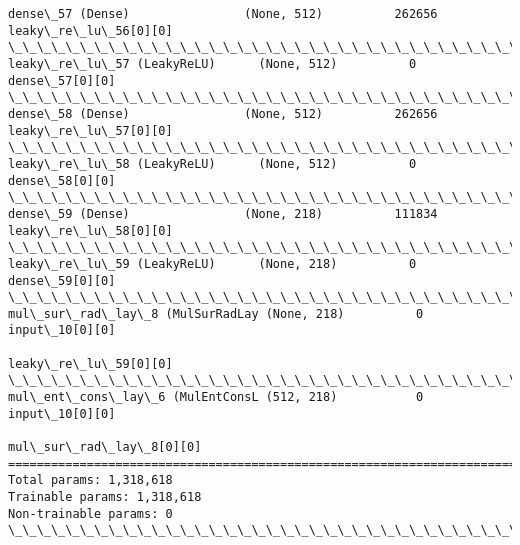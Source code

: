\documentclass[11pt]{article}
\begin{document}
\begin{Verbatim}[commandchars=\\\{\}]
dense\_57 (Dense)                (None, 512)          262656      leaky\_re\_lu\_56[0][0]             
\_\_\_\_\_\_\_\_\_\_\_\_\_\_\_\_\_\_\_\_\_\_\_\_\_\_\_\_\_\_\_\_\_\_\_\_\_\_\_\_\_\_\_\_\_\_\_\_\_\_\_\_\_\_\_\_\_\_\_\_\_\_\_\_\_\_\_\_\_\_\_\_\_\_\_\_\_\_\_\_\_\_\_\_\_\_\_\_\_\_\_\_\_\_\_\_\_\_
leaky\_re\_lu\_57 (LeakyReLU)      (None, 512)          0           dense\_57[0][0]                   
\_\_\_\_\_\_\_\_\_\_\_\_\_\_\_\_\_\_\_\_\_\_\_\_\_\_\_\_\_\_\_\_\_\_\_\_\_\_\_\_\_\_\_\_\_\_\_\_\_\_\_\_\_\_\_\_\_\_\_\_\_\_\_\_\_\_\_\_\_\_\_\_\_\_\_\_\_\_\_\_\_\_\_\_\_\_\_\_\_\_\_\_\_\_\_\_\_\_
dense\_58 (Dense)                (None, 512)          262656      leaky\_re\_lu\_57[0][0]             
\_\_\_\_\_\_\_\_\_\_\_\_\_\_\_\_\_\_\_\_\_\_\_\_\_\_\_\_\_\_\_\_\_\_\_\_\_\_\_\_\_\_\_\_\_\_\_\_\_\_\_\_\_\_\_\_\_\_\_\_\_\_\_\_\_\_\_\_\_\_\_\_\_\_\_\_\_\_\_\_\_\_\_\_\_\_\_\_\_\_\_\_\_\_\_\_\_\_
leaky\_re\_lu\_58 (LeakyReLU)      (None, 512)          0           dense\_58[0][0]                   
\_\_\_\_\_\_\_\_\_\_\_\_\_\_\_\_\_\_\_\_\_\_\_\_\_\_\_\_\_\_\_\_\_\_\_\_\_\_\_\_\_\_\_\_\_\_\_\_\_\_\_\_\_\_\_\_\_\_\_\_\_\_\_\_\_\_\_\_\_\_\_\_\_\_\_\_\_\_\_\_\_\_\_\_\_\_\_\_\_\_\_\_\_\_\_\_\_\_
dense\_59 (Dense)                (None, 218)          111834      leaky\_re\_lu\_58[0][0]             
\_\_\_\_\_\_\_\_\_\_\_\_\_\_\_\_\_\_\_\_\_\_\_\_\_\_\_\_\_\_\_\_\_\_\_\_\_\_\_\_\_\_\_\_\_\_\_\_\_\_\_\_\_\_\_\_\_\_\_\_\_\_\_\_\_\_\_\_\_\_\_\_\_\_\_\_\_\_\_\_\_\_\_\_\_\_\_\_\_\_\_\_\_\_\_\_\_\_
leaky\_re\_lu\_59 (LeakyReLU)      (None, 218)          0           dense\_59[0][0]                   
\_\_\_\_\_\_\_\_\_\_\_\_\_\_\_\_\_\_\_\_\_\_\_\_\_\_\_\_\_\_\_\_\_\_\_\_\_\_\_\_\_\_\_\_\_\_\_\_\_\_\_\_\_\_\_\_\_\_\_\_\_\_\_\_\_\_\_\_\_\_\_\_\_\_\_\_\_\_\_\_\_\_\_\_\_\_\_\_\_\_\_\_\_\_\_\_\_\_
mul\_sur\_rad\_lay\_8 (MulSurRadLay (None, 218)          0           input\_10[0][0]                   
                                                                 leaky\_re\_lu\_59[0][0]             
\_\_\_\_\_\_\_\_\_\_\_\_\_\_\_\_\_\_\_\_\_\_\_\_\_\_\_\_\_\_\_\_\_\_\_\_\_\_\_\_\_\_\_\_\_\_\_\_\_\_\_\_\_\_\_\_\_\_\_\_\_\_\_\_\_\_\_\_\_\_\_\_\_\_\_\_\_\_\_\_\_\_\_\_\_\_\_\_\_\_\_\_\_\_\_\_\_\_
mul\_ent\_cons\_lay\_6 (MulEntConsL (512, 218)           0           input\_10[0][0]                   
                                                                 mul\_sur\_rad\_lay\_8[0][0]          
==================================================================================================
Total params: 1,318,618
Trainable params: 1,318,618
Non-trainable params: 0
\_\_\_\_\_\_\_\_\_\_\_\_\_\_\_\_\_\_\_\_\_\_\_\_\_\_\_\_\_\_\_\_\_\_\_\_\_\_\_\_\_\_\_\_\_\_\_\_\_\_\_\_\_\_\_\_\_\_\_\_\_\_\_\_\_\_\_\_\_\_\_\_\_\_\_\_\_\_\_\_\_\_\_\_\_\_\_\_\_\_\_\_\_\_\_\_\_\_

    \end{Verbatim}
\end{document}
